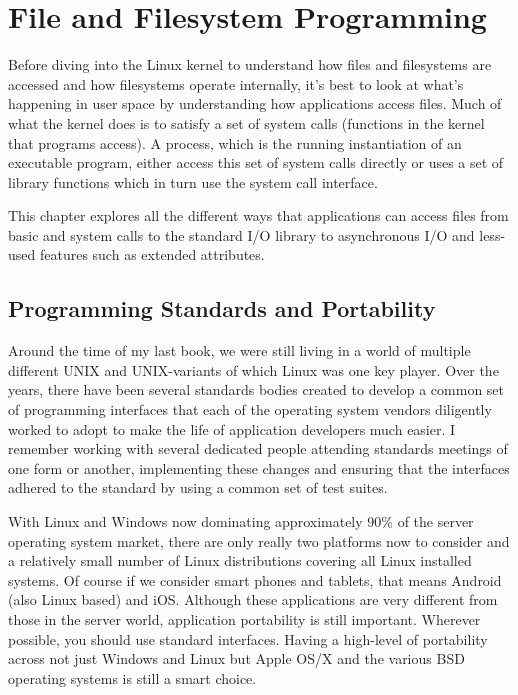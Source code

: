 \chapter{File and Filesystem Programming}


Before diving into the Linux kernel to understand how files and filesystems are accessed and how filesystems operate internally, it's best to look at what's happening in user space by understanding how applications access files. Much of what the kernel does is to satisfy a set of system calls (functions in the kernel that programs access). A process, which is the running instantiation of an executable program, either access this set of system calls directly or uses a set of library functions which in turn use the system call interface.

This chapter explores all the different ways that applications can access files from basic  and  system calls to the standard I/O library to asynchronous I/O and less-used features such as extended attributes. 

\section{Programming Standards and Portability}

Around the time of my last book, we were still living in a world of multiple different UNIX and UNIX-variants of which Linux was one key player. Over the years, there have been several standards bodies created to develop a common set of programming interfaces that each of the operating system vendors diligently worked to adopt to make the life of application developers much easier. I remember working with several dedicated people attending standards meetings of one form or another, implementing these changes and ensuring that the interfaces adhered to the standard by using a common set of test suites.

With Linux and Windows now dominating approximately 90\% of the server operating system market, there are only really two platforms now to consider and a relatively small number of Linux distributions covering all Linux installed systems. Of course if we consider smart phones and tablets, that means Android (also Linux based) and iOS. Although these applications are very different from those in the server world, application portability is still important. Wherever possible, you should use standard interfaces. Having a high-level of portability across not just Windows and Linux but Apple OS/X and the various BSD operating systems is still a smart choice.

